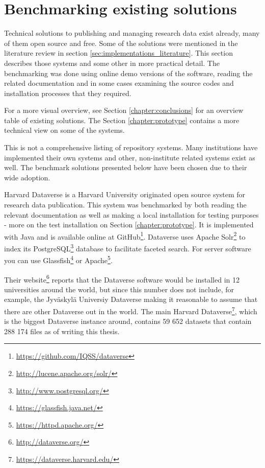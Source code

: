 \section{Benchmarking existing solutions}
\label{sec:benchmarking}

Technical solutions to publishing and managing research data exist already, many
of them open source and free. Some of the solutions were mentioned in the
literature review in section \ref{sec:implementations_literature}. This section describes
those systems and some other in more practical detail. The benchmarking was
done using online demo versions of the software, reading the related
documentation and in some cases examining the source codes and installation
processes that they required.

For a more visual overview, see Section \ref{chapter:conclusions} for an
overview table of existing solutions. The Section \ref{chapter:prototype}
contains a more technical view on some of the systems.

This is not a comprehensive listing of repository systems. Many institutions
have implemented their own systems and other, non-institute related systems
exist as well. The benchmark solutions presented below have been chosen due to
their wide adoption.

Harvard Dataverse is a Harvard University originated open source system
for research data publication. This system was benchmarked by both reading the
relevant documentation as well as making a local installation for testing
purposes - more on the test installation on Section \ref{chapter:prototype}.
It is implemented with Java and is available
online at GitHub\footnote{\url{https://github.com/IQSS/dataverse}}. Dataverse
uses Apache Solr\footnote{\url{http://lucene.apache.org/solr/}} to index its
PostgreSQL\footnote{\url{http://www.postgresql.org/}} database to facilitate
faceted search. For server software you can use Glassfish\footnote{\url{https://glassfish.java.net/}}
or Apache\footnote{\url{https://httpd.apache.org/}}.

Their website\footnote{\url{http://dataverse.org/}} reports that the Dataverse
software would be installed in 12 universities around the world, but since this
number does not include, for example, the Jyväskylä Universiy Dataverse making
it reasonable to assume that there are other Dataverse out in the world. The
main Harvard Dataverse\footnote{\url{https://dataverse.harvard.edu/}}, which
is the biggest Dataverse instance around, contains 59 652 datasets that contain
288 174 files as of writing this thesis.


